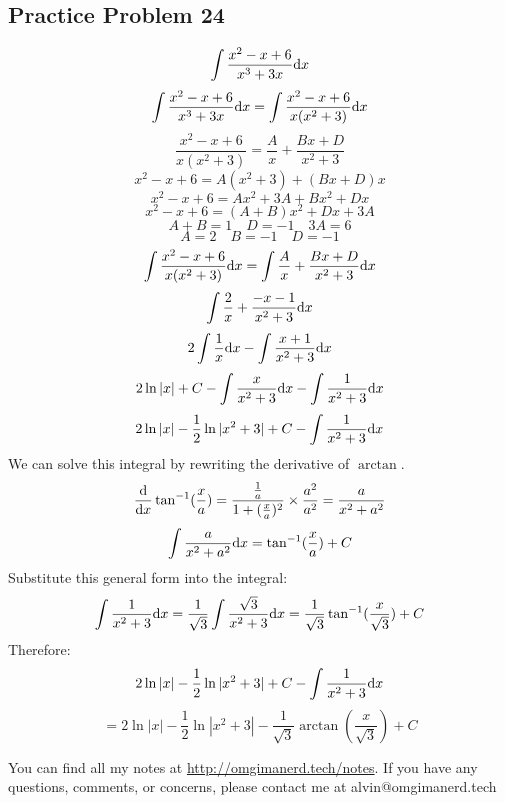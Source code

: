 \documentclass[letterpaper, 12pt]{math}
\begin{document}
\subsection*{Practice Problem 24}
\[ \int{\frac{x^{2}-x+6}{x^{3}+3x}\mathrm{d}{x}} \]
\[ \int{\frac{x^{2}-x+6}{x^{3}+3x}\mathrm{d}{x}} =
   \int{\frac{x^{2}-x+6}{x(x^{2}+3)}\mathrm{d}{x}} \]
\[ \frac{x^{2}-x+6}{x(x^{2}+3)} = \frac{A}{x}+\frac{Bx+D}{x^{2}+3} \]
\[ x^{2}-x+6 = A(x^{2}+3)+(Bx+D)x \]
\[ x^{2}-x+6 = Ax^{2}+3A+Bx^{2}+Dx \]
\[ x^{2}-x+6 = (A+B)x^{2}+Dx+3A \]
\[ A+B = 1 \quad D = -1 \quad 3A = 6 \]
\[ A = 2 \quad B = -1 \quad D = -1 \]
\[ \int{\frac{x^{2}-x+6}{x(x^{2}+3)}\mathrm{d}{x}} =
   \int{\frac{A}{x}+\frac{Bx+D}{x^{2}+3}\mathrm{d}{x}} \]
\[ \int{\frac{2}{x}+\frac{-x-1}{x^{2}+3}\mathrm{d}{x}} \]
\[ 2\int{\frac{1}{x}\mathrm{d}{x}}-\int{\frac{x+1}{x^{2}+3}\mathrm{d}{x}} \]
\[ 2\ln|x|+C-\int{\frac{x}{x^{2}+3}\mathrm{d}{x}}-\int{\frac{1}{x^{2}+3}\mathrm{d}{x}} \]
\[ 2\ln|x|-\frac{1}{2}\ln|x^{2}+3|+C-\int{\frac{1}{x^{2}+3}\mathrm{d}{x}} \]
We can solve this integral by rewriting the derivative of \( \arctan \).
\[ \frac{\mathrm{d}}{\mathrm{d}{x}}\tan^{-1}(\frac{x}{a}) =
   \frac{\frac{1}{a}}{1+(\frac{x}{a})^{2}}\times\frac{a^{2}}{a^{2}} =
   \frac{a}{x^{2}+a^{2}} \]
\[ \int{\frac{a}{x^{2}+a^{2}}\mathrm{d}{x}} = \tan^{-1}(\frac{x}{a})+C \]
Substitute this general form into the integral:
\[ \int{\frac{1}{x^{2}+3}\mathrm{d}{x}} =
   \frac{1}{\sqrt{3}}\int{\frac{\sqrt{3}}{x^{2}+3}\mathrm{d}{x}} =
   \frac{1}{\sqrt{3}}\tan^{-1}(\frac{x}{\sqrt{3}})+C \]
Therefore:
\[ 2\ln|x|-\frac{1}{2}\ln|x^{2}+3|+C-\int{\frac{1}{x^{2}+3}\mathrm{d}{x}} \]
\[ = 2\ln|x|-\frac{1}{2}\ln|x^{2}+3|-
   \frac{1}{\sqrt{3}}\arctan(\frac{x}{\sqrt{3}})+C \]

\begin{center}
  You can find all my notes at \url{http://omgimanerd.tech/notes}. If you have
  any questions, comments, or concerns, please contact me at
  alvin@omgimanerd.tech
\end{center}
\end{document}
